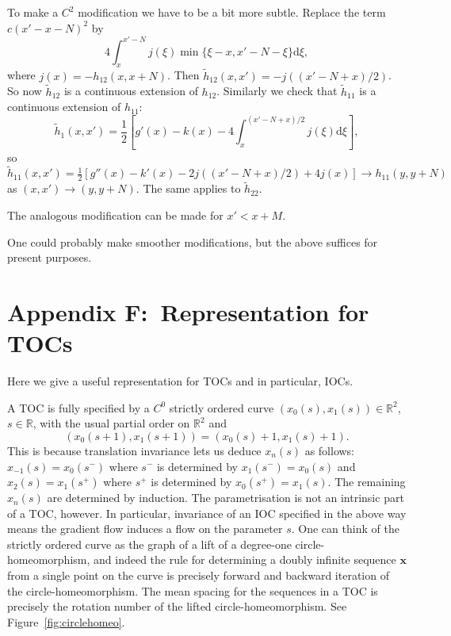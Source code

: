 \documentclass[12pt]{article}
\newcommand{\R}{\mathbb{R}}
\newcounter{number}
\renewcommand{\thelemma}{\thesection.\thenumber}
\renewcommand{\theequation}{\arabic{section}.\arabic{equation}}
\newcommand{\xbf}{{\mathbf{x}}}
\begin{document}
To make a $C^2$ modification we have to be a bit more subtle.  Replace the term $c (x'-x-N)^2$ by
$$
4 \int_x^{x'-N} j(\xi)\min\{\xi-x,x'-N-\xi\}\mbox{d}\xi,
 $$
 where $j(x) =- h_{12}(x,x+N)$.  Then $\tilde{h}_{12}(x,x') = -j((x'-N+x)/2)$.  So now $\tilde{h}_{12}$ is a continuous extension of $h_{12}$.  Similarly we check that $\tilde{h}_{11}$ is a continuous extension of $h_{11}$:
$$\tilde{h}_1(x,x') = \frac12\left[g'(x)-k(x)-4\int_x^{(x'-N+x)/2} j(\xi) \mbox{d}\xi\right],$$
so
$$\tilde{h}_{11}(x,x') = \tfrac12[g''(x)-k'(x)-2j((x'-N+x)/2)+4j(x)] \to h_{11}(y,y+N)$$ as $(x,x') \to (y,y+N)$.
The same applies to $\tilde{h}_{22}$.

The analogous modification can be made for $x'<x+M$.

One could probably make smoother modifications, but the above suffices for present purposes.


\section*{Appendix F:~Representation for TOCs}
\label{app:TOCrep}
 \setcounter{theorem}{0}
 \setcounter{equation}{0}
 \setcounter{lemma}{0}
 \renewcommand{\theequation}{F.\arabic{equation}}
\renewcommand{\thelemma}{F.\arabic{lemma}}

Here we give a useful representation for TOCs and in particular, IOCs.

A TOC is fully specified by a $C^0$ strictly ordered curve $(x_0(s),x_1(s)) \in \R^2$, $s \in \R$, with the usual partial order on $\R^2$ and
\begin{equation}
(x_0(s+1),x_1(s+1)) = (x_0(s)+1,x_1(s)+1).
\label{eq:percond}
\end{equation}
This is because translation invariance lets us deduce $x_n(s)$ as follows: $x_{-1}(s) = x_0(s^-)$ where $s^-$ is determined by $x_1(s^-)=x_0(s)$ and $x_2(s) = x_1(s^+)$ where $s^+$ is determined by $x_0(s^+)=x_1(s)$.  The remaining $x_n(s)$ are determined by induction.  The parametrisation is not an intrinsic part of a TOC, however.  In particular, invariance of an IOC specified in the above way means the gradient flow induces a flow on the parameter $s$.
One can think of the strictly ordered curve as the graph of a lift of a degree-one circle-homeomorphism, and indeed the rule for determining a doubly infinite sequence $\xbf$ from a single point on the curve is precisely forward and backward iteration of the circle-homeomorphism.  The mean spacing for the sequences in a TOC is precisely the rotation number of the lifted circle-homeomorphism. See Figure~\ref{fig:circlehomeo}. %
\end{document}
